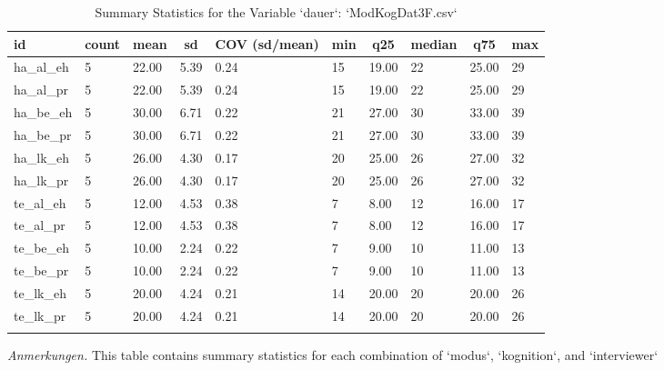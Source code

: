 \documentclass[
  doc,floatsintext]{apa6}
\begin{document}
\begin{table}[tbp]

\begin{center}
\begin{threeparttable}

\caption{\label{tab:tabsummary3}Summary Statistics for the Variable `dauer`:  `ModKogDat3F.csv`}

\begin{tabular}{llllllllll}
\toprule
id & \multicolumn{1}{c}{count} & \multicolumn{1}{c}{mean} & \multicolumn{1}{c}{sd} & \multicolumn{1}{c}{COV (sd/mean)} & \multicolumn{1}{c}{min} & \multicolumn{1}{c}{q25} & \multicolumn{1}{c}{median} & \multicolumn{1}{c}{q75} & \multicolumn{1}{c}{max}\\
\midrule
ha\_al\_eh & 5 & 22.00 & 5.39 & 0.24 & 15 & 19.00 & 22 & 25.00 & 29\\
ha\_al\_pr & 5 & 22.00 & 5.39 & 0.24 & 15 & 19.00 & 22 & 25.00 & 29\\
ha\_be\_eh & 5 & 30.00 & 6.71 & 0.22 & 21 & 27.00 & 30 & 33.00 & 39\\
ha\_be\_pr & 5 & 30.00 & 6.71 & 0.22 & 21 & 27.00 & 30 & 33.00 & 39\\
ha\_lk\_eh & 5 & 26.00 & 4.30 & 0.17 & 20 & 25.00 & 26 & 27.00 & 32\\
ha\_lk\_pr & 5 & 26.00 & 4.30 & 0.17 & 20 & 25.00 & 26 & 27.00 & 32\\
te\_al\_eh & 5 & 12.00 & 4.53 & 0.38 & 7 & 8.00 & 12 & 16.00 & 17\\
te\_al\_pr & 5 & 12.00 & 4.53 & 0.38 & 7 & 8.00 & 12 & 16.00 & 17\\
te\_be\_eh & 5 & 10.00 & 2.24 & 0.22 & 7 & 9.00 & 10 & 11.00 & 13\\
te\_be\_pr & 5 & 10.00 & 2.24 & 0.22 & 7 & 9.00 & 10 & 11.00 & 13\\
te\_lk\_eh & 5 & 20.00 & 4.24 & 0.21 & 14 & 20.00 & 20 & 20.00 & 26\\
te\_lk\_pr & 5 & 20.00 & 4.24 & 0.21 & 14 & 20.00 & 20 & 20.00 & 26\\
\bottomrule
\addlinespace
\end{tabular}

\begin{tablenotes}[para]
\normalsize{\textit{Anmerkungen.} This table contains summary statistics for each combination of `modus`,  `kognition`, and `interviewer`}
\end{tablenotes}

\end{threeparttable}
\end{center}

\end{table}
\end{document}
